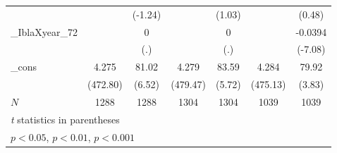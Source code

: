 {\begin{tabular}{l*{6}{c}}
            &                     &     (-1.24)         &                     &      (1.03)         &                     &      (0.48)         \\
[1em]
\_IblaXyear\_72&                     &           0         &                     &           0         &                     &     -0.0394\sym{***}\\
            &                     &         (.)         &                     &         (.)         &                     &     (-7.08)         \\
[1em]
\_cons      &       4.275\sym{***}&       81.02\sym{***}&       4.279\sym{***}&       83.59\sym{***}&       4.284\sym{***}&       79.92\sym{***}\\
            &    (472.80)         &      (6.52)         &    (479.47)         &      (5.72)         &    (475.13)         &      (3.83)         \\
\hline
\(N\)       &        1288         &        1288         &        1304         &        1304         &        1039         &        1039         \\
\hline\hline
\multicolumn{7}{l}{\footnotesize \textit{t} statistics in parentheses}\\
\multicolumn{7}{l}{\footnotesize \sym{*} \(p<0.05\), \sym{**} \(p<0.01\), \sym{***} \(p<0.001\)}\\
\end{tabular}
}
